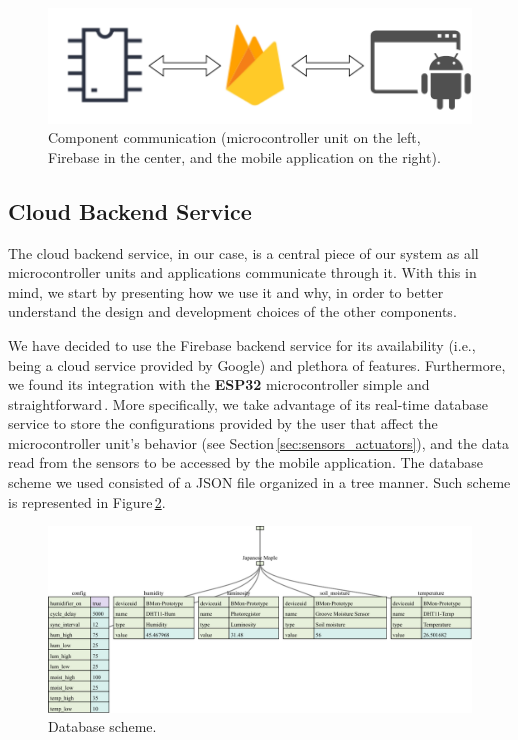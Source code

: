 \documentclass{article}
\begin{document}

\begin{figure}[!ht]
    \centering
    \includegraphics[width=1\textwidth]{figures/communication}
    \caption{Component communication (microcontroller unit on the left, Firebase
    in the center, and the mobile application on the right).}
    \label{fig:communication}
\end{figure}



\subsection{Cloud Backend Service}
The cloud backend service, in our case, is a central piece of our system as all
microcontroller units and applications communicate through it. With this in
mind, we start by presenting how we use it and why, in order to better
understand the design and development choices of the other components.

We have decided to use the Firebase backend service for its availability (i.e.,
being a cloud service provided by Google) and plethora of features. Furthermore,
we found its integration with the \textbf{ESP32} microcontroller simple and
straightforward\,\cite{firebase_esp32,mozbit}. More specifically, we take
advantage of its real-time database service to store the configurations provided
by the user that affect the microcontroller unit's behavior (see
Section\,\ref{sec:sensors_actuators}), and the data read from the sensors to be
accessed by the mobile application. The database scheme we used consisted of a
JSON file organized in a tree manner. Such scheme is represented in
Figure\,\ref{fig:database}.

\begin{figure}[!ht]
    \centering
    \includegraphics[width=1\textwidth]{figures/database_diagram}
    \caption{Database scheme.}
    \label{fig:database}
\end{figure}
\end{document}
